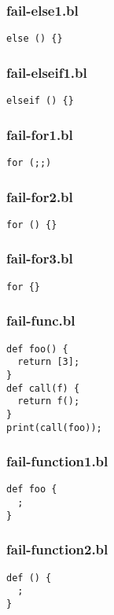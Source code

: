 \subsubsection{fail-else1.bl}
\begin{lstlisting}
else () {}\end{lstlisting}
\subsubsection{fail-elseif1.bl}
\begin{lstlisting}
elseif () {}\end{lstlisting}
\subsubsection{fail-for1.bl}
\begin{lstlisting}
for (;;)\end{lstlisting}
\subsubsection{fail-for2.bl}
\begin{lstlisting}
for () {}\end{lstlisting}
\subsubsection{fail-for3.bl}
\begin{lstlisting}
for {}\end{lstlisting}
\subsubsection{fail-func.bl}
\begin{lstlisting}
def foo() {
  return [3];
}
def call(f) {
  return f();
}
print(call(foo));\end{lstlisting}
\subsubsection{fail-function1.bl}
\begin{lstlisting}
def foo {
  ;
}\end{lstlisting}
\subsubsection{fail-function2.bl}
\begin{lstlisting}
def () {
  ;
}\end{lstlisting}

